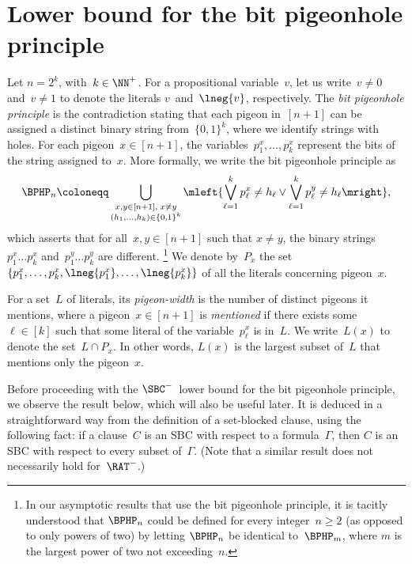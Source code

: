 \documentclass[10pt,a4paper]{article}
\begin{document}
\section{Lower bound for the bit pigeonhole principle}
\label{sec:lower-bound-for-BPHP}

Let $n = 2^k$, with~$k \in \NN^+$.
For a propositional variable~$v$,
let us write~$v \neq 0$ and~$v \neq 1$
to denote the literals $v$~and~$\lneg{v}$, respectively.
The \emph{bit pigeonhole principle} is the contradiction stating that
each pigeon in~$[n + 1]$ can be assigned a distinct binary string from~$\{0,1\}^k$,
where we identify strings with holes.
For each pigeon~$x \in [n + 1]$, the variables~$p^x_1, \dots, p^x_k$
represent the bits of the string assigned to~$x$.
More formally, we write the bit pigeonhole principle as
\begin{equation*}
  \BPHP_n \coloneqq
  \bigcup_{\substack{x, y \in [n + 1],\; x \neq y \\ (h_1, \dots, h_k) \in \{0, 1\}^k}}
  \mleft\{\bigvee_{\ell = 1}^k p^x_\ell \neq h_\ell
  \lor \bigvee_{\ell = 1}^k p^y_\ell \neq h_\ell \mright\},
\end{equation*}
which asserts that for all~$x, y \in [n + 1]$ such that $x \neq y$,
the binary strings~$p^x_1 \dots p^x_k$ and~$p^y_1 \dots p^y_k$ are different.%
\footnote{In our asymptotic results that use the bit pigeonhole principle,
  it is tacitly understood that $\BPHP_n$ could be defined for every integer~$n \geq 2$
  (as opposed to only powers of two) by letting $\BPHP_n$ be identical to~$\BPHP_m$,
  where $m$ is the largest power of two not exceeding~$n$.}
We denote by~$P_x$ the set~$\{p^x_1, \dots, p^x_k,
\lneg{p^x_1}, \dots, \lneg{p^x_k}\}$ of all the literals concerning pigeon~$x$.

For a set~$L$ of literals,
its \emph{pigeon-width} is the number of distinct pigeons it mentions,
where a pigeon~$x \in [n + 1]$ is \emph{mentioned} if there exists some~$\ell \in [k]$
such that some literal of the variable~$p^x_\ell$ is in~$L$.
We write~$L(x)$ to denote the set~$L \cap P_x$.
In other words, $L(x)$ is the largest subset of~$L$ that mentions only the pigeon~$x$.

Before proceeding with the $\SBC^-$~lower bound for the bit pigeonhole principle,
we observe the result below, which will also be useful later.
It is deduced in a straightforward way
from the definition of a set-blocked clause,
using the following fact:
if a clause~$C$ is an SBC with respect to a formula~$\Gamma$,
then $C$ is an SBC with respect to every subset of~$\Gamma$.
(Note that a similar result does not necessarily hold for~$\RAT^-$.)
\end{document}
